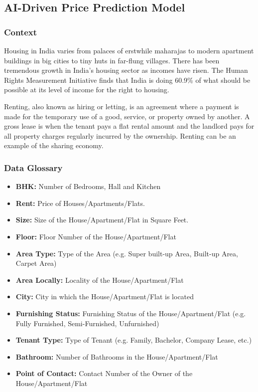 \subsection{AI-Driven Price Prediction Model}

\subsubsection{Context}
Housing in India varies from palaces of erstwhile maharajas to modern apartment buildings in big cities to tiny huts in far-flung villages. There has been tremendous growth in India's housing sector as incomes have risen. The Human Rights Measurement Initiative finds that India is doing 60.9\% of what should be possible at its level of income for the right to housing.\par
\medskip
Renting, also known as hiring or letting, is an agreement where a payment is made for the temporary use of a good, service, or property owned by another. A gross lease is when the tenant pays a flat rental amount and the landlord pays for all property charges regularly incurred by the ownership. Renting can be an example of the sharing economy.

\clearpage
\subsubsection{Data Glossary}
\begin{itemize}
    \item \textbf{BHK:} Number of Bedrooms, Hall and Kitchen
    \item \textbf{Rent:} Price of Houses/Apartments/Flats.
    \item \textbf{Size:} Size of the House/Apartment/Flat in Square Feet.
    \item \textbf{Floor:} Floor Number of the House/Apartment/Flat
    \item \textbf{Area Type:} Type of the Area (e.g. Super built-up Area, Built-up Area, Carpet Area)
    \item \textbf{Area Locally:} Locality of the House/Apartment/Flat
    \item \textbf{City:} City in which the House/Apartment/Flat is located
    \item \textbf{Furnishing Status:} Furnishing Status of the House/Apartment/Flat (e.g. Fully Furnished, Semi-Furnished, Unfurnished)
    \item \textbf{Tenant Type:} Type of Tenant (e.g. Family, Bachelor, Company Lease, etc.)
    \item \textbf{Bathroom:} Number of Bathrooms in the House/Apartment/Flat
    \item \textbf{Point of Contact:} Contact Number of the Owner of the House/Apartment/Flat
\end{itemize}

